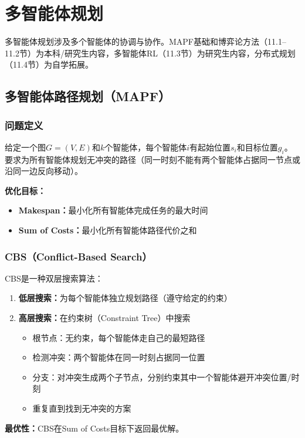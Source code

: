 \chapter{多智能体规划}

\begin{levelbox}
多智能体规划涉及多个智能体的协调与协作。MAPF基础和博弈论方法（11.1--11.2节）为本科/研究生内容，多智能体RL（11.3节）为研究生内容，分布式规划（11.4节）为自学拓展。
\end{levelbox}

\section{多智能体路径规划（MAPF） \ug}

\subsection{问题定义}

\begin{definition}[MAPF问题]
给定一个图$G=(V,E)$和$k$个智能体，每个智能体$i$有起始位置$s_i$和目标位置$g_i$。要求为所有智能体规划无冲突的路径（同一时刻不能有两个智能体占据同一节点或沿同一边反向移动）。
\end{definition}

\textbf{优化目标：}
\begin{itemize}
  \item \textbf{Makespan：}最小化所有智能体完成任务的最大时间
  \item \textbf{Sum of Costs：}最小化所有智能体路径代价之和
\end{itemize}

\subsection{CBS（Conflict-Based Search） \ug}

\begin{algbox}[title={\textbf{CBS算法}}]
CBS是一种双层搜索算法：
\begin{enumerate}
  \item \textbf{低层搜索：}为每个智能体独立规划路径（遵守给定的约束）
  \item \textbf{高层搜索：}在约束树（Constraint Tree）中搜索
    \begin{itemize}
      \item 根节点：无约束，每个智能体走自己的最短路径
      \item 检测冲突：两个智能体在同一时刻占据同一位置
      \item 分支：对冲突生成两个子节点，分别约束其中一个智能体避开冲突位置/时刻
      \item 重复直到找到无冲突的方案
    \end{itemize}
\end{enumerate}
\textbf{最优性：}CBS在Sum of Costs目标下返回最优解。
\end{algbox}

